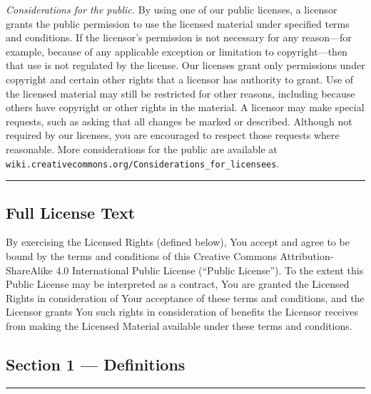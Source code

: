 \medskip
\textit{Considerations for the public.} By using one of our public licenses, a licensor grants the public permission to use the licensed material under specified terms and conditions. If the licensor's permission is not necessary for any reason---for example, because of any applicable exception or limitation to copyright---then that use is not regulated by the license. Our licenses grant only permissions under copyright and certain other rights that a licensor has authority to grant. Use of the licensed material may still be restricted for other reasons, including because others have copyright or other rights in the material. A licensor may make special requests, such as asking that all changes be marked or described. Although not required by our licenses, you are encouraged to respect those requests where reasonable. More considerations for the public are available at \nolinkurl{wiki.creativecommons.org/Considerations_for_licensees}.

\smallskip
\noindent\rule{\textwidth}{0.4pt}

\subsection*{Full License Text}

By exercising the Licensed Rights (defined below), You accept and agree to be bound by the terms and conditions of this Creative Commons Attribution-ShareAlike 4.0 International Public License (``Public License''). To the extent this Public License may be interpreted as a contract, You are granted the Licensed Rights in consideration of Your acceptance of these terms and conditions, and the Licensor grants You such rights in consideration of benefits the Licensor receives from making the Licensed Material available under these terms and conditions.

\subsection*{Section 1 --- Definitions}
\noindent\rule{\textwidth}{0.3pt}
\smallskip

